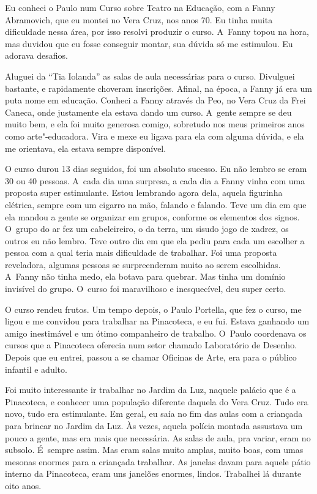 Eu conheci o Paulo num Curso sobre Teatro na Educação, com a Fanny
Abramovich, que eu montei no Vera Cruz, nos anos 70. Eu tinha muita
dificuldade nessa área, por isso resolvi produzir o curso. A~Fanny topou
na hora, mas duvidou que eu fosse conseguir montar, sua dúvida só me
estimulou. Eu adorava desafios.

Aluguei da ``Tia Iolanda'' as salas de aula necessárias para o curso.
Divulguei bastante, e rapidamente choveram inscrições. Afinal, na época,
a Fanny já era um puta nome em educação. Conheci a Fanny através da Peo,
no Vera Cruz da Frei Caneca, onde justamente ela estava dando um curso.
A~gente sempre se deu muito bem, e ela foi muito generosa comigo,
sobretudo nos meus primeiros anos como arte"-educadora. Vira e mexe eu
ligava para ela com alguma dúvida, e ela me orientava, ela estava sempre
disponível.

O curso durou 13 dias seguidos, foi um absoluto sucesso. Eu não lembro
se eram 30 ou 40 pessoas. A~cada dia uma surpresa, a cada dia a Fanny
vinha com uma proposta super estimulante. Estou lembrando agora dela,
aquela figurinha elétrica, sempre com um cigarro na mão, falando e
falando. Teve um dia em que ela mandou a gente se organizar em grupos,
conforme os elementos dos signos. O~grupo do ar fez um cabeleireiro, o
da terra, um sisudo jogo de xadrez, os outros eu não lembro. Teve outro
dia em que ela pediu para cada um escolher a pessoa com a qual teria
mais dificuldade de trabalhar. Foi uma proposta reveladora, algumas
pessoas se surpreenderam muito ao serem escolhidas. A~Fanny não tinha
medo, ela botava para quebrar. Mas tinha um domínio invisível do grupo.
O~curso foi maravilhoso e inesquecível, deu super certo.

O curso rendeu frutos. Um tempo depois, o Paulo Portella, que fez o
curso, me ligou e me convidou para trabalhar na Pinacoteca, e eu fui.
Estava ganhando um amigo inestimável e um ótimo companheiro de trabalho.
O~Paulo coordenava os cursos que a Pinacoteca oferecia num setor chamado
Laboratório de Desenho. Depois que eu entrei, passou a se chamar
Oficinas de Arte, era para o público infantil e adulto.

Foi muito interessante ir trabalhar no Jardim da Luz, naquele palácio
que é a Pinacoteca, e conhecer uma população diferente daquela do Vera
Cruz. Tudo era novo, tudo era estimulante. Em geral, eu saía no fim das
aulas com a criançada para brincar no Jardim da Luz. Às vezes, aquela
polícia montada assustava um pouco a gente, mas era mais que necessária.
As salas de aula, pra variar, eram no subsolo. É~sempre assim. Mas eram
salas muito amplas, muito boas, com umas mesonas enormes para a
criançada trabalhar. As janelas davam para aquele pátio interno da
Pinacoteca, eram uns janelões enormes, lindos. Trabalhei lá durante oito
anos.

